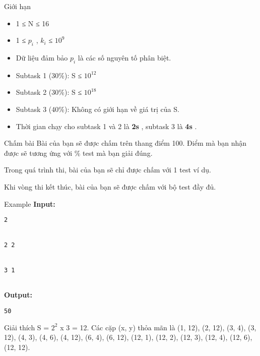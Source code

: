 Giới hạn
\begin{itemize}
	\item     1 ≤ N ≤ 16   
	\item     1 ≤ $p_{i}$    , $k_{i}$    ≤ $10^{9}$
	\item     Dữ liệu đảm bảo $p_{i}$    là các số nguyên tố phân biệt.   
	\item     Subtask 1 (30\%): S ≤ $10^{12}$
	\item     Subtask 2 (30\%): S ≤ $10^{18}$
	\item     Subtask 3 (40\%): Không có giới hạn về giá trị của S.   
	\item     Thời gian chạy cho subtask 1 và 2 là    \textbf{     2s    }    , subtask 3 là    \textbf{     4s    }    .   
\end{itemize}
Chấm bài
Bài của bạn sẽ được chấm trên thang điểm 100. Điểm mà bạn nhận được sẽ tương ứng với \% test mà bạn giải đúng.  

   Trong quá trình thi, bài của bạn sẽ chỉ được chấm với 1 test ví dụ.  

   Khi vòng thi kết thúc, bài của bạn sẽ được chấm với bộ test đầy đủ.  
\begin{itemize}
\end{itemize}
\begin{itemize}
\end{itemize}
Example
\textbf{    Input:   }
\begin{verbatim}
2


2 2


3 1 


\end{verbatim}

\textbf{    Output:   }
\begin{verbatim}
50
\end{verbatim}
Giải thích
S = $2^{2}$   x 3 = 12. Các cặp (x, y) thỏa mãn là (1, 12), (2, 12), (3, 4), (3, 12), (4, 3), (4, 6), (4, 12), (6, 4), (6, 12), (12, 1), (12, 2), (12, 3), (12, 4), (12, 6), (12, 12).